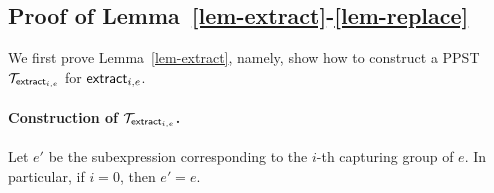 
%


 
\subsection{Proof of Lemma~\ref{lem-extract}-\ref{lem-replace}}

We first prove Lemma~\ref{lem-extract}, namely, show how to construct a PPST $\mathcal{T}_{\mathsf{extract}_{i,e}}$ for $\mathsf{extract}_{i,e}$.

\paragraph*{Construction of $\mathcal{T}_{\mathsf{extract}_{i,e}}$.} 
Let $e'$ be the subexpression corresponding to the $i$-th capturing group of $e$. In particular, if $i=0$, then $e' = e$. 

